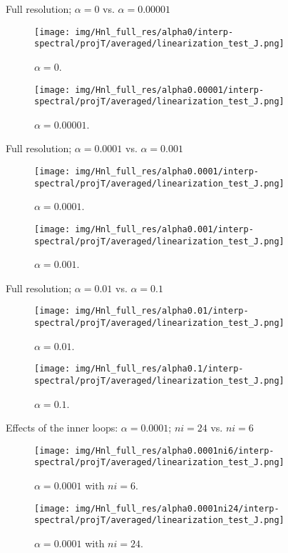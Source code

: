 \documentclass[francais]{beamer}
\begin{document}
\begin{frame}{Full resolution; $\alpha=0$ vs. $\alpha=0.00001$}
\begin{center}
\begin{figure}
  \texttt{[image: img/Hnl\_full\_res/alpha0/interp-spectral/projT/averaged/linearization\_test\_J.png]}
  \caption{$\alpha = 0$.}
\endminipage\hfill
{}
  \texttt{[image: img/Hnl\_full\_res/alpha0.00001/interp-spectral/projT/averaged/linearization\_test\_J.png]}
  \caption{$\alpha = 0.00001$.}
\endminipage
\end{figure}
\end{center}
\end{frame}

\begin{frame}{Full resolution; $\alpha=0.0001$ vs. $\alpha=0.001$}
\begin{center}
\begin{figure}
  \texttt{[image: img/Hnl\_full\_res/alpha0.0001/interp-spectral/projT/averaged/linearization\_test\_J.png]}
  \caption{$\alpha = 0.0001$.}
\endminipage\hfill
{}
  \texttt{[image: img/Hnl\_full\_res/alpha0.001/interp-spectral/projT/averaged/linearization\_test\_J.png]}
  \caption{$\alpha = 0.001$.}
\endminipage
\end{figure}
\end{center}
\end{frame}

\begin{frame}{Full resolution; $\alpha=0.01$ vs. $\alpha=0.1$}
\begin{center}
\begin{figure}
  \texttt{[image: img/Hnl\_full\_res/alpha0.01/interp-spectral/projT/averaged/linearization\_test\_J.png]}
  \caption{$\alpha = 0.01$.}
\endminipage\hfill
{}
  \texttt{[image: img/Hnl\_full\_res/alpha0.1/interp-spectral/projT/averaged/linearization\_test\_J.png]}
  \caption{$\alpha = 0.1$.}
\endminipage
\end{figure}
\end{center}
\end{frame}

\begin{frame}{Effects of the inner loops: $\alpha=0.0001$; $ni=24$ vs. $ni=6$}
\begin{center}
\begin{figure}
  \texttt{[image: img/Hnl\_full\_res/alpha0.0001ni6/interp-spectral/projT/averaged/linearization\_test\_J.png]}
  \caption{$\alpha = 0.0001$ with $ni=6$.}
\endminipage\hfill
{}
  \texttt{[image: img/Hnl\_full\_res/alpha0.0001ni24/interp-spectral/projT/averaged/linearization\_test\_J.png]}
  \caption{$\alpha = 0.0001$ with $ni=24$.}
\endminipage
\end{figure}
\end{center}
\end{frame}
\end{document}
